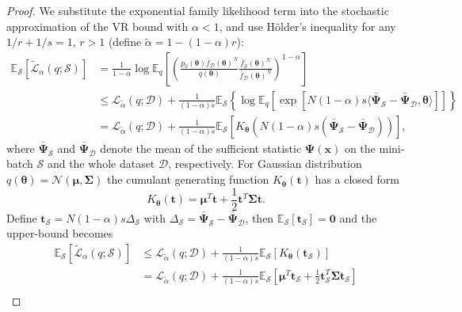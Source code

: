\begin{proof}
We substitute the exponential family likelihood term into the stochastic approximation of the VR bound with $\alpha < 1$, and use H{\"o}lder's inequality for any $1/r + 1/s = 1$, $r > 1$ (define $\tilde{\alpha} = 1 - (1 - \alpha) r$):
\begin{equation*}
\begin{aligned}
\mathbb{E}_{\mathcal{S}} [\tilde{\mathcal{L}}_{\alpha}(q; \mathcal{S})] 
    &= \frac{1}{1 - \alpha} \log \mathbb{E}_{q} [ \left( \frac{p_0(\bm{\theta}) \bar{f}_{\mathcal{D}}(\bm{\theta})^N} {q(\bm{\theta})} \frac{\bar{f}_{\mathcal{S}}(\bm{\theta})^N}{\bar{f}_{\mathcal{D}}(\bm{\theta})^N}  \right)^{1 - \alpha} ] \\
	&\leq \mathcal{L}_{\tilde{\alpha}}(q; \mathcal{D}) + \frac{1}{(1 - \alpha)s} \mathbb{E}_{\mathcal{S}} \left\lbrace \log \mathbb{E}_{q} [ \exp [N(1 - \alpha) s \langle \bar{\bm{\Psi}}_{\mathcal{S}} - \bar{\bm{\Psi}}_{\mathcal{D}}, \bm{\theta} \rangle ] ] \right\rbrace \\
	&= \mathcal{L}_{\tilde{\alpha}}(q; \mathcal{D}) + \frac{1}{(1 - \alpha)s} \mathbb{E}_{\mathcal{S}} [K_{\bm{\theta}}(N(1 - \alpha) s (\bar{\bm{\Psi}}_{\mathcal{S}} - \bar{\bm{\Psi}}_{\mathcal{D}})) ],
\end{aligned}
\end{equation*}
where $\bar{\bm{\Psi}}_{\mathcal{S}}$ and $\bar{\bm{\Psi}}_{\mathcal{D}}$ denote the mean of the sufficient statistic $\bm{\Psi}(\bm{x})$ on the mini-batch $\mathcal{S}$ and the whole dataset $\mathcal{D}$, respectively. For Gaussian distribution $q(\bm{\theta}) = \mathcal{N}(\bm{\mu}, \bm{\Sigma})$ the cumulant generating function $K_{\bm{\theta}}(\bm{t})$ has a closed form
\begin{equation*}
K_{\bm{\theta}}(\bm{t}) = \bm{\mu}^T\bm{t} + \frac{1}{2} \bm{t}^T \bm{\Sigma} \bm{t}.
\end{equation*}
Define $\bm{t}_{\mathcal{S}} = N(1 - \alpha) s \Delta_{\mathcal{S}}$ with $\Delta_{\mathcal{S}} = \bar{\bm{\Psi}}_{\mathcal{S}} - \bar{\bm{\Psi}}_{\mathcal{D}}$, then $\mathbb{E}_{\mathcal{S}}[\bm{t}_{\mathcal{S}}] = \bm{0}$ and the upper-bound becomes
\begin{equation*}
\begin{aligned}
\mathbb{E}_{\mathcal{S}} [\tilde{\mathcal{L}}_{\alpha}(q; \mathcal{S})] 
	&\leq \mathcal{L}_{\tilde{\alpha}}(q; \mathcal{D}) + \frac{1}{(1 - \alpha)s} \mathbb{E}_{\mathcal{S}} [K_{\bm{\theta}}(\bm{t}_{\mathcal{S}}) ]\\
	&= \mathcal{L}_{\tilde{\alpha}}(q; \mathcal{D}) + \frac{1}{(1 - \alpha)s} \mathbb{E}_{\mathcal{S}} [\bm{\mu}^T\bm{t}_{\mathcal{S}} + \frac{1}{2} \bm{t}_{\mathcal{S}}^T \bm{\Sigma} \bm{t}_{\mathcal{S}} ] \\

\end{aligned}
\end{equation*}
\end{proof}
